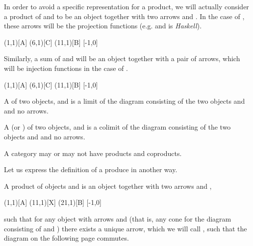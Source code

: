 \documentclass{seminar}
\begin{document}
\begin{slide}
\newpage

In order to avoid a specific representation for a product, we will
actually consider a product of  and  to be an object
 together with two arrows  and
.  In the case of , these arrows
will be the projection functions (e.g.  and  is
\textit{Haskell}).
\begin{cdiag}
\obj(1,1)[A]{}
\obj(6,1)[C]{}
\obj(11,1)[B]{}
[-1,0]
\end{cdiag}

Similarly, a sum of 
and  will be an object  together with a pair of arrows,
which will be injection functions in the case of .
\begin{cdiag}
\obj(1,1)[A]{}
\obj(6,1)[C]{}
\obj(11,1)[B]{}
[-1,0]
\end{cdiag}

\newpage

A  of two objects,  and  is a limit
of the diagram  consisting of the two objects  and 
and no arrows.

A  (or )
of two objects,  and  is a colimit
of the diagram  consisting of the two objects  and 
and no arrows.

A category may or may not have products and coproducts.

\newslide

Let us express the definition of a produce in another way.

A product of objects  and  is an object 
together with two arrows  and
,

\begin{cdiag}
\obj(1,1)[A]{}
\obj(11,1)[X]{}
\obj(21,1)[B]{}
[-1,0]
\end{cdiag}

such that for any object  with arrows  and
(that is, any cone for the diagram consisting of  and )
there exists a unique arrow, which we will call
, such that the diagram on the following page commutes.


\end{slide}
\end{document}

